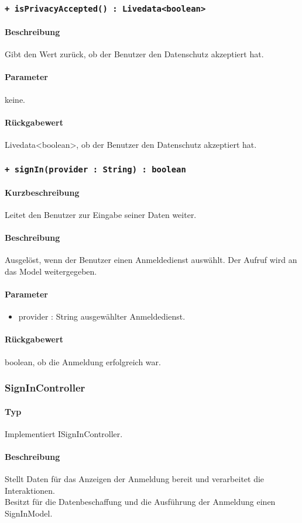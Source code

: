 \subsubsection{\texttt{+ isPrivacyAccepted() : Livedata<boolean>}}%
\paragraph*{Beschreibung}
Gibt den Wert zurück, ob der Benutzer den Datenschutz akzeptiert hat.
\paragraph*{Parameter}
keine.
\paragraph*{Rückgabewert}
Livedata<boolean>, ob der Benutzer den Datenschutz akzeptiert hat.

\subsubsection{\texttt{+ signIn(provider : String) : boolean}}%
\paragraph*{Kurzbeschreibung}
Leitet den Benutzer zur Eingabe seiner Daten weiter.
\paragraph*{Beschreibung}
Ausgelöst, wenn der Benutzer einen Anmeldedienst auswählt. 
Der Aufruf wird an das Model weitergegeben.
\paragraph*{Parameter}
\begin{itemize}
    \item provider : String ausgewählter Anmeldedienst.
\end{itemize}
\paragraph*{Rückgabewert}
boolean, ob die Anmeldung erfolgreich war.

\subsubsection{SignInController}
\paragraph*{Typ}
Implementiert ISignInController.
\paragraph*{Beschreibung}
Stellt Daten für das Anzeigen der Anmeldung bereit und verarbeitet die Interaktionen.\\
Besitzt für die Datenbeschaffung und die Ausführung der Anmeldung einen SignInModel.

